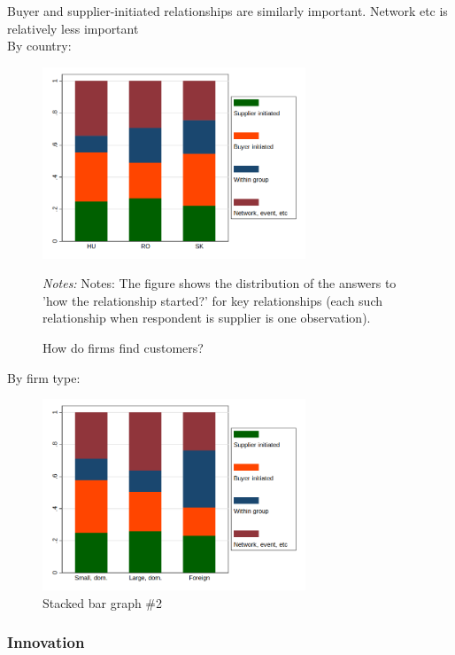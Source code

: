 \documentclass[final, dvipsnames, authoryear,12pt]{elsarticle}
\begin{document}
Buyer and supplier-initiated relationships are similarly important. Network etc is relatively less important\\
By country:
\begin{figure}[!h]
    \caption{How do firms find customers?}
    \label{fig:rel_form1}
    \begin{center}
    \includegraphics[width=0.7\textwidth]{graphs/Table6a.png}
    \end{center}{}    
       {\footnotesize \textit{Notes:} Notes: The figure shows the distribution of the answers to ’how the relationship started?’ for key relationships (each such relationship when respondent is supplier is one observation).} 
\end{figure}
By firm type:
\begin{figure}[!h]
    \centering
    \includegraphics[width=0.7\textwidth]{graphs/Table6b.png}
    \caption{Stacked bar graph \#2}
    \label{fig:my_label}
\end{figure}


\subsubsection{Innovation}
\end{document}

